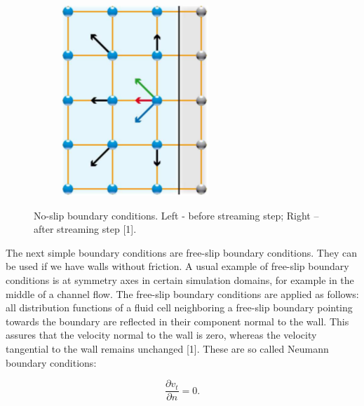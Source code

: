 \begin{figure}[H]
\begin{subfigure}[h]{0.3\textwidth}
    \includegraphics[width=\textwidth]{img/fig8-2.png}
  \end{subfigure}
  \caption{No-slip boundary conditions. Left - before streaming step; Right – after streaming step [1].}
\end{figure}

The next simple boundary conditions are free-slip boundary conditions. They can be used if we have walls without friction. A usual example of free-slip boundary conditions is at symmetry axes in certain simulation domains, for example in the middle of a channel flow. The free-slip boundary conditions are applied as follows: all distribution functions of a fluid cell neighboring a free-slip boundary pointing towards the boundary are reflected in their component normal to the wall. This assures that the velocity normal to the wall is zero, whereas the velocity tangential to the wall remains unchanged [1]. These are so called Neumann boundary conditions:

\begin{equation}
\frac{\partial v_t}{\partial n} = 0.
\end{equation}

